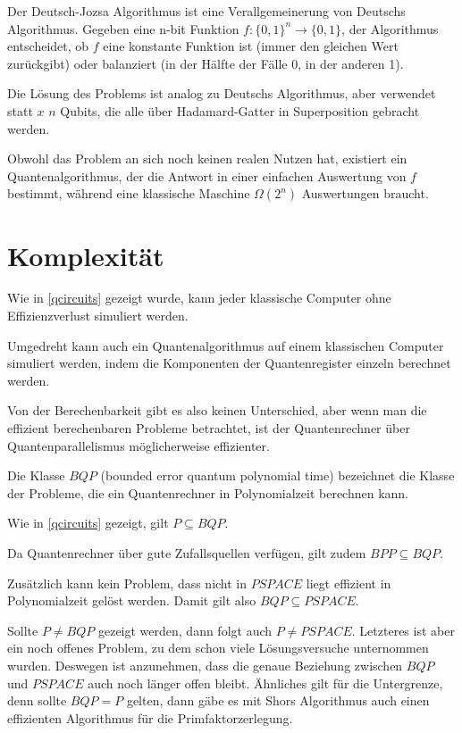 \documentclass{acm_proc_article-sp}
\begin{document}
Der Deutsch-Jozsa Algorithmus ist eine Verallgemeinerung von Deutschs Algorithmus.
Gegeben eine n-bit Funktion $f : \{0,1\}^n \rightarrow \{0,1\} $, der Algorithmus entscheidet, ob $f$ eine konstante Funktion
ist (immer den gleichen Wert zurückgibt) oder balanziert (in der Hälfte der Fälle 0, in der anderen 1).

Die Lösung des Problems ist analog zu Deutschs Algorithmus, aber verwendet statt $x$ $n$ Qubits, die alle über Hadamard-Gatter
in Superposition gebracht werden.

Obwohl das Problem an sich noch keinen realen Nutzen hat, existiert ein Quantenalgorithmus, der die Antwort in einer einfachen
Auswertung von $f$ bestimmt, während eine klassische Maschine $\Omega(2^n)$ Auswertungen braucht.

\section{Komplexität}

Wie in \ref{qcircuits} gezeigt wurde, kann jeder klassische Computer ohne Effizienzverlust simuliert werden.

Umgedreht kann auch ein Quantenalgorithmus auf einem klassischen Computer simuliert werden, indem
die Komponenten der Quantenregister einzeln berechnet werden. 

Von der Berechenbarkeit gibt es also keinen Unterschied, aber wenn man die effizient berechenbaren Probleme betrachtet,
ist der Quantenrechner über Quantenparallelismus möglicherweise effizienter.

Die Klasse $BQP$ (bounded error quantum polynomial time) bezeichnet die Klasse der Probleme, die ein Quantenrechner in 
Polynomialzeit berechnen kann.

Wie in \ref{qcircuits} gezeigt, gilt $P \subseteq BQP$.

Da Quantenrechner über gute Zufallsquellen verfügen, gilt zudem $BPP \subseteq BQP$.

Zusätzlich kann kein Problem, dass nicht in $PSPACE$ liegt effizient in Polynomialzeit gelöst werden.
Damit gilt also $BQP \subseteq PSPACE$. 

Sollte $P \neq BQP$ gezeigt werden, dann folgt auch $ P \neq PSPACE$.
Letzteres ist aber ein noch offenes Problem, zu dem schon viele Lösungsversuche unternommen wurden.
Deswegen ist anzunehmen, dass die genaue Beziehung zwischen $BQP$ und $PSPACE$ auch noch länger offen bleibt.
Ähnliches gilt für die Untergrenze, denn sollte $BQP = P$ gelten, dann gäbe es mit Shors Algorithmus auch einen 
effizienten Algorithmus für die Primfaktorzerlegung.
\end{document}
